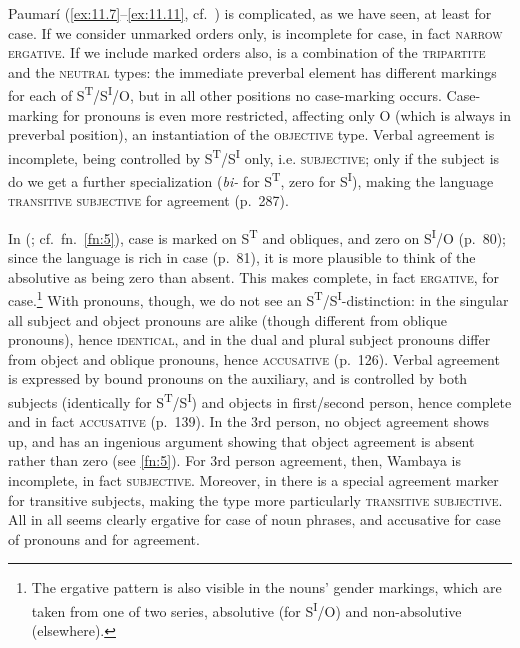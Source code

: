 \documentclass[output=paper]{langsci/langscibook}
\begin{document}
Paumarí (\ref{ex:11.7}--\ref{ex:11.11}, cf.\ \citealt{ChapmanDerbyshire1991}) is complicated, as we
have seen, at least for case. If we consider unmarked orders only,  is
incomplete for case, in fact \textsc{narrow ergative}. If we include marked
orders also,  is a combination of the \textsc{tripartite} and the
\textsc{neutral} types: the immediate preverbal element has different markings
for each of S\textsuperscript{T}/S\textsuperscript{I}/O, but in all other
positions no case-marking occurs. Case-marking for pronouns is even more
restricted, affecting only O (which is always in preverbal position), an
instantiation of the \textsc{objective} type. Verbal agreement is incomplete,
being controlled by S\textsuperscript{T}/S\textsuperscript{I} only, i.e.
\textsc{subjective}; only if the subject is \Tsg{} do we get a further
specialization (\emph{bi-} for S\textsuperscript{T}, zero for
S\textsuperscript{I}), making the language \textsc{transitive subjective} for
\Tsg{} agreement (p.\ 287).

In  (\citealt{Nordlinger1998}; cf.\ fn.~\ref{fn:5}), case is marked on
S\textsuperscript{T} and obliques, and zero on S\textsuperscript{I}/O (p.\ 80);
since the language is rich in case (p.\ 81), it is more plausible to think of the
absolutive as being zero than absent. This makes  complete, in fact
\textsc{ergative}, for case.\footnote{The ergative pattern is also visible in
the nouns’ gender markings, which are taken from one of two series, absolutive
(for S\textsuperscript{I}/O) and non-absolutive (elsewhere).\label{fn:13}} With
pronouns, though, we do not see an
S\textsuperscript{T}/S\textsuperscript{I}{}-distinction: in the singular all
subject and object pronouns are alike (though different from oblique pronouns),
hence \textsc{identical}, and in the dual and plural subject pronouns differ
from object and oblique pronouns, hence \textsc{accusative} (p.~126). Verbal
agreement is expressed by bound pronouns on the auxiliary, and is controlled by
both subjects (identically for S\textsuperscript{T}/S\textsuperscript{I}) and
objects in first/second person, hence complete and in fact \textsc{accusative}
(p.\ 139). In the 3rd person, no object agreement shows up, and
\citet{Nordlinger1998} has an ingenious argument showing that object agreement
is absent rather than zero (see \cref{fn:5}). For 3rd person agreement, then,
Wambaya is incomplete, in fact \textsc{subjective}. Moreover, in \Tsg{} there
is a special agreement marker for transitive subjects, making the type more
particularly \textsc{transitive subjective}. All in all  seems clearly
ergative for case of noun phrases, and accusative for case of pronouns and for
agreement.
\end{document}
